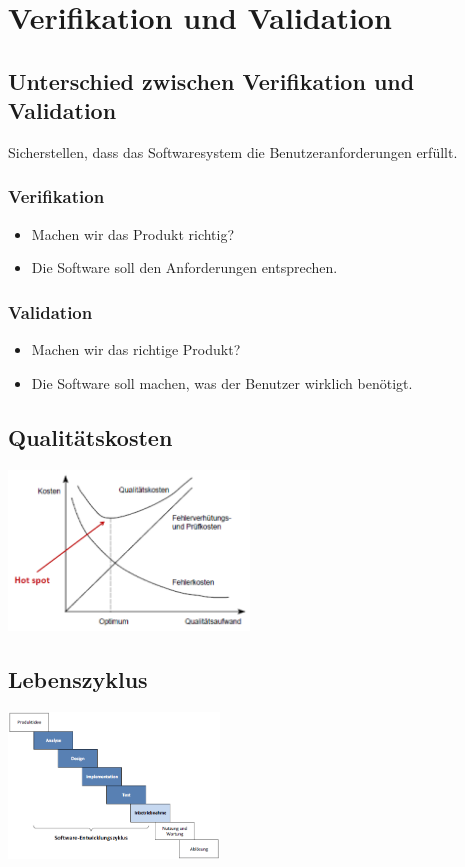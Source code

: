 \section{Verifikation und Validation}
\subsection{Unterschied zwischen Verifikation und Validation}
Sicherstellen, dass das Softwaresystem die Benutzeranforderungen erfüllt.
\begin{multicols}{2}
    \subsubsection{Verifikation}
    \begin{itemize}
        \item Machen wir das Produkt richtig?
        \item Die Software soll den Anforderungen entsprechen.
    \end{itemize}
    
    \subsubsection{Validation}
    \begin{itemize}
        \item Machen wir das richtige Produkt?
        \item Die Software soll machen, was der Benutzer wirklich benötigt.
    \end{itemize}
\end{multicols}

\begin{multicols}{2}
    \subsection{Qualitätskosten}
    \includegraphics[width=0.48\textwidth]{images/VerifikationValidation/qualitaetskosten}
    
    \subsection{Lebenszyklus}
    \includegraphics[width=0.42\textwidth]{images/VerifikationValidation/lebenszyklus}
\end{multicols}

